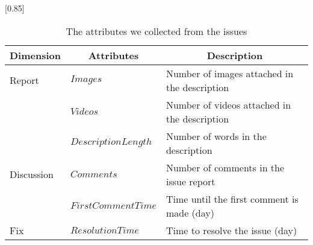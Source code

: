 
\begin{table}[t]
    \begin{center}
    \caption{The attributes we collected from the issues}
    \scalebox{0.85}[0.85]{
    \begin{tabular}{llp{4.6cm}} 
        \toprule
        \multicolumn{1}{c}{\textbf{Dimension}}&\multicolumn{1}{c}{\textbf{Attributes}} & \multicolumn{1}{c}{\textbf{Description}} \\ 
        \midrule
        Report&$Images$ & Number of images attached in the description \\
        &$Videos$ & Number of videos attached in the description \\
        &$DescriptionLength$ & Number of words in the description\\
        \hline
        Discussion&$Comments$ & Number of comments in the issue report\\
        &$FirstCommentTime$ & Time until the first comment is made (day) \\
        
        \hline
        Fix&$ResolutionTime$ & Time to resolve the issue (day) \\

        \bottomrule
    \end{tabular}
    }
    \label{tab:issue-attr}
    \end{center}
\end{table}
